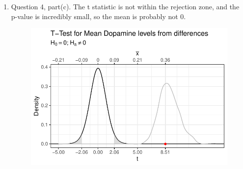 \documentclass{article}\usepackage[]{graphicx}\usepackage[]{xcolor}
\makeatletter
\def\maxwidth{ %
  \ifdim\Gin@nat@width>\linewidth
    \linewidth
  \else
    \Gin@nat@width
  \fi
}
\newenvironment{knitrout}{}{} %
\makeatother
\begin{document}
\begin{enumerate}
\begin{enumerate}
  \item Question 4, part(c). The t statistic is not within the rejection zone, and the p-value is incredibly small, so the mean is probably not 0.

\begin{figure}[H]
\begin{center}
\begin{knitrout}
\color{fgcolor}
\includegraphics[width=\maxwidth]{figure/unnamed-chunk-11-1} 
\end{knitrout}
\label{plot4} 
\end{center}
\end{figure}

\end{enumerate}
\end{enumerate}



\end{document}
